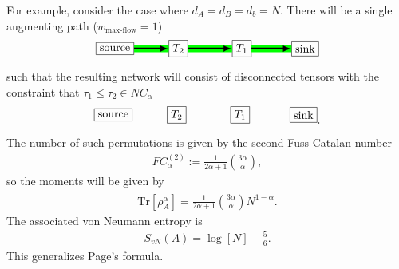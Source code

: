 \documentclass[a4paper,11pt]{article}
\newcommand{\Tr}{\text{Tr}}
\begin{document}
For example, consider the case where $d_A = d_B = d_b = N$. There will be a single augmenting path ($w_{\text{max-flow}} = 1$) 
\begin{align}
\begin{tikzpicture}
    \node[draw, shape=rectangle] (T1) at (2,0) {$T_1$};
    \node[draw, shape=rectangle] (T2) at (0,0) {$T_2$};
    \node[draw, shape=rectangle] (so) at (-2,0) {source};
    \node[draw, shape=rectangle] (si) at (4,0) {sink};
    \draw [ultra thick,-latex,preaction={draw,green,-,double=green,double distance=2\pgflinewidth,}] (T2) -- (T1);
    \draw [ultra thick,-latex,preaction={draw,green,-,double=green,double distance=2\pgflinewidth,}] (T1) -- (si);
    \draw [ultra thick,-latex,preaction={draw,green,-,double=green,double distance=2\pgflinewidth,}] (so) -- (T2);
    \end{tikzpicture}
\end{align}
such that the resulting network will consist of disconnected tensors with the constraint that $\tau_1 \leq \tau_2 \in NC_{\alpha}$
\begin{align}
\begin{tikzpicture}
    \node[draw, shape=rectangle] (T1) at (2,0) {$T_1$};
    \node[draw, shape=rectangle] (T2) at (0,0) {$T_2$};
    \node[draw, shape=rectangle] (so) at (-2,0) {source};
    \node[draw, shape=rectangle] (si) at (4,0) {sink};
    \end{tikzpicture}.
\end{align}
The number of such permutations is given by the second Fuss-Catalan number
\begin{align}
    FC^{(2)}_{\alpha} :=  \frac{1}{2\alpha +1}\binom{3\alpha }{\alpha},
\end{align}
so the moments will be given by
\begin{align}
    \overline{\Tr\left[ \rho_A^{\alpha}\right]} =\frac{1}{2\alpha +1}\binom{3\alpha }{\alpha}N^{ 1- \alpha } .
\end{align}
The associated von Neumann entropy is
\begin{align}
    S_{vN}(A) = \log\left[N\right] -\frac{5}{6}.
\end{align}
This generalizes Page's formula.
\end{document}
